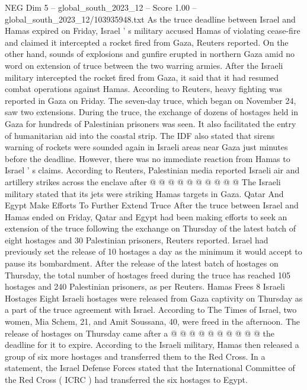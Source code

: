 \begin{textsample}{NEG Dim 5 – global\_south\_2023\_12 – Score 1.00 – global\_south\_2023\_12/103935948.txt}  \label{ex:f5_neg_234}
As the truce deadline between Israel and Hamas expired on Friday, Israel ' s military accused Hamas of violating cease-fire and claimed it intercepted a rocket fired from Gaza, Reuters reported.
On the other hand, sounds of explosions and gunfire erupted in northern Gaza amid no word on extension of truce between the two warring armies.
After the Israeli military intercepted the rocket fired from Gaza, it said that it had resumed combat operations against Hamas.
According to Reuters, heavy fighting was reported in Gaza on Friday.
The seven-day truce, which began on November 24, saw two extensions.
During the truce, the exchange of dozens of hostages held in Gaza for hundreds of Palestinian prisoners was seen.
It also facilitated the entry of humanitarian aid into the coastal strip.
The IDF also stated that sirens warning of rockets were sounded again in Israeli areas near Gaza just minutes before the deadline.
However, there was no immediate reaction from Hamas to Israel ' s claims.
According to Reuters, Palestinian media reported Israeli air and artillery strikes across the enclave after @ @ @ @ @ @ @ @ @ @ The Israeli military stated that its jets were striking Hamas targets in Gaza.
Qatar And Egypt Make Efforts To Further Extend Truce After the truce between Israel and Hamas ended on Friday, Qatar and Egypt had been making efforts to seek an extension of the truce following the exchange on Thursday of the latest batch of eight hostages and 30 Palestinian prisoners, Reuters reported.
Israel had previously set the release of 10 hostages a day as the minimum it would accept to pause its bombardment.
After the release of the latest batch of hostages on Thursday, the total number of hostages freed during the truce has reached 105 hostages and 240 Palestinian prisoners, as per Reuters.
Hamas Frees 8 Israeli Hostages Eight Israeli hostages were released from Gaza captivity on Thursday as a part of the truce agreement with Israel.
According to The Times of Israel, two women, Mia Schem, 21, and Amit Soussana, 40, were freed in the afternoon.
The release of hostages on Thursday came after a @ @ @ @ @ @ @ @ @ @ the deadline for it to expire.
According to the Israeli military, Hamas then released a group of six more hostages and transferred them to the Red Cross.
In a statement, the Israel Defense Forces stated that the International Committee of the Red Cross ( ICRC ) had transferred the six hostages to Egypt.

\end{textsample}
